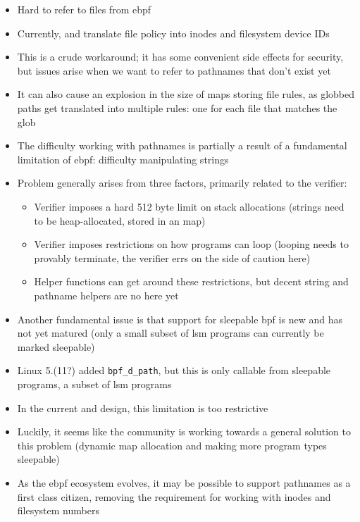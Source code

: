 \begin{inprogress}
  \begin{itemize}
    \item Hard to refer to files from \gls{ebpf}
    \item Currently, \bpfbox{} and \bpfcontain{} translate file policy into inodes and filesystem device IDs
    \item This is a crude workaround; it has some convenient side effects for security,
    but issues arise when we want to refer to pathnames that don't exist yet
    \item It can also cause an explosion in the size of maps storing file rules, as
    globbed paths get translated into multiple rules: one for each file that matches the
    glob

    \item The difficulty working with pathnames is partially a result of a fundamental limitation of \gls{ebpf}: difficulty manipulating strings
    \item Problem generally arises from three factors, primarily related to the verifier:
    \begin{itemize}
      \item Verifier imposes a hard 512 byte limit on stack allocations (strings need to be heap-allocated, stored in an map)
      \item Verifier imposes restrictions on how programs can loop (looping needs to provably terminate, the verifier errs on the side of caution here)
      \item Helper functions can get around these restrictions, but decent string and pathname helpers are no here yet
    \end{itemize}
    \item Another fundamental issue is that support for sleepable \gls{bpf} is new and has
    not yet matured (only a small subset of \gls{lsm} programs can currently be marked
    sleepable)
    \item Linux 5.(11?) added \texttt{bpf\_d\_path}, but this is only callable from sleepable programs, a subset of \gls{lsm} programs
    \item In the current \bpfbox{} and \bpfcontain{} design, this limitation is too restrictive
    \item Luckily, it seems like the community is working towards a general solution to
    this problem (dynamic map allocation and making more program types sleepable)
    \item As the \gls{ebpf} ecosystem evolves, it may be possible to support pathnames as
    a first class citizen, removing the requirement for working with inodes and filesystem
    numbers
  \end{itemize}
\end{inprogress}

